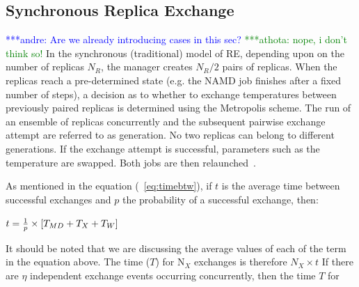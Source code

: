 \documentclass{rspublic}
\newcommand{\alnote}[1]{ {\textcolor{blue} { ***andre: #1 }}}
\newcommand{\athotanote}[1]{ {\textcolor{green} { ***athota: #1 }}}
\newcommand{\alnote}[1]{}
\newcommand{\athotanote}[1]{}
\begin{document}



\subsection{Synchronous Replica Exchange}

\alnote{Are we already introducing cases in this sec?} \athotanote{nope, i don't think so!}
In the synchronous (traditional) model of RE, depending upon
on the number of replicas ${N_R}$, the manager creates ${N_R/2}$ pairs
of replicas. When the replicas reach a
pre-determined state (e.g. the NAMD job finishes after a fixed number
of steps), a decision as to whether to exchange temperatures between
previously paired replicas is determined using the Metropolis scheme.
The run of an ensemble of replicas concurrently and the subsequent
pairwise exchange attempt are referred to as generation. No two
replicas can belong to different generations. If the exchange attempt
is successful, parameters such as the temperature are swapped. Both
jobs are then relaunched~\citep{Luckow:2008fp}.

As mentioned in the equation (~\ref{eq:timebtw}), if $t$ is the average time between successful exchanges and $p$ the probability of a successful exchange, then:

$t =  {1 \over p} \times {[T_{MD} + T_{X} + T_{W}]}$

It should be noted that we are discussing the average values of each of the term in the equation above.
The time ($T$) for N$_{X}$ exchanges is therefore $N_{X} \times t$
If there are $\eta$ independent exchange events occurring concurrently, then the time $T$ for 



\end{document}
